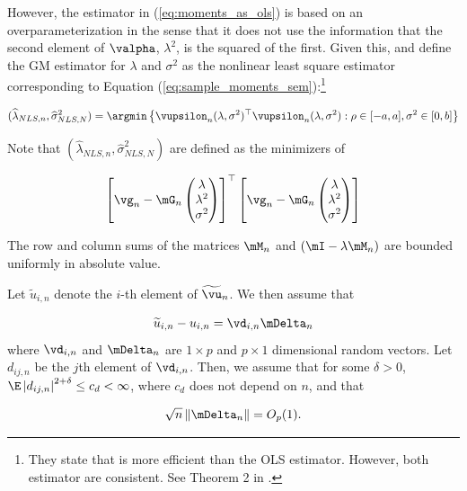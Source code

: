 \documentclass[english,12pt]{book}\usepackage[]{graphicx}\usepackage[]{xcolor}
\begin{document}
However, the estimator in (\ref{eq:moments_as_ols}) is based on an overparameterization in the sense that it does not use the information that the second element of $\valpha$, $\lambda^2$, is the squared of the first. Given this, \cite{kelejian1998generalized} and \cite{kelejian1999generalized} define the GM estimator for $\lambda$ and $\sigma^2$ as the nonlinear least square estimator corresponding to Equation (\ref{eq:sample_moments_sem}):\footnote{They state that is more efficient than the OLS estimator. However, both estimator are consistent. See Theorem 2 in \citep{kelejian1998generalized}.}


\begin{equation}\label{eq:nls_estimator}
  (\widehat{\lambda}_{NLS, n}, \widehat{\sigma}^2_{NLS, N}) = \argmin \left\lbrace \vupsilon_n(\lambda, \sigma^2)^\top\vupsilon_n(\lambda, \sigma^2): \rho \in [-a, a], \sigma^2\in [0, b]\right\rbrace 
\end{equation}

Note that $(\widehat{\lambda}_{NLS, n}, \widehat{\sigma}^2_{NLS, N})$ are defined as the minimizers of

\begin{equation*}
\left[\vg_n - \mG_n \begin{pmatrix}\lambda \\ \lambda ^2 \\ \sigma^2\end{pmatrix}\right]^\top \left[\vg_n - \mG_n \begin{pmatrix}\lambda \\ \lambda ^2 \\ \sigma^2\end{pmatrix}\right]
\end{equation*}

\begin{assumption}\label{assu:bounded_matrix_M}
The row and column sums of the matrices $\mM_n$ and $(\mI - \lambda\mM_n)$ are bounded uniformly in absolute value.
\end{assumption}

\begin{assumption}\label{assu:residuals_gm}
Let $\widetilde{u}_{i, n}$ denote the $i$-th element of $\widetilde{\vu}_n$. We then assume that

\begin{equation*}
\widetilde{u}_{i, n} - u_{i,n} = \vd_{i,n}\mDelta_n
\end{equation*}
%
where $\vd_{i, n}$ and $\mDelta_n$ are $1\times p$ and $p\times 1$ dimensional random vectors. Let $d_{ij,n}$ be the $j$th element of $\vd_{i, n}$. Then, we assume that for some $\delta>0$, $\E\left|d_{ij,n}\right|^{2 + \delta}\leq c_{d} < \infty$, where $c_d$ does not depend on $n$, and that

\begin{equation}
\sqrt{n}\left\lVert \mDelta_n\right\rVert = O_p(1).
\end{equation}
\end{assumption}
\end{document}

